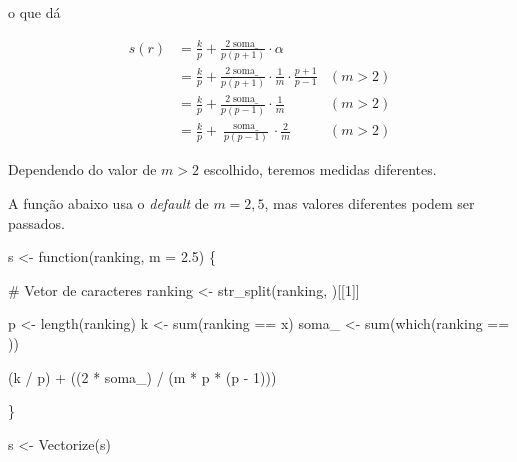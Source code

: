 \documentclass[
  letterpaper,
  DIV=11,
  numbers=noendperiod]{scrreprt}
\newenvironment{Shaded}{\begin{snugshade}}{\end{snugshade}}
\newcommand{\AttributeTok}[1]{\textcolor[rgb]{0.40,0.45,0.13}{#1}}
\newcommand{\CommentTok}[1]{\textcolor[rgb]{0.37,0.37,0.37}{#1}}
\newcommand{\ControlFlowTok}[1]{\textcolor[rgb]{0.00,0.23,0.31}{#1}}
\newcommand{\DecValTok}[1]{\textcolor[rgb]{0.68,0.00,0.00}{#1}}
\newcommand{\FloatTok}[1]{\textcolor[rgb]{0.68,0.00,0.00}{#1}}
\newcommand{\FunctionTok}[1]{\textcolor[rgb]{0.28,0.35,0.67}{#1}}
\newcommand{\NormalTok}[1]{\textcolor[rgb]{0.00,0.23,0.31}{#1}}
\newcommand{\OtherTok}[1]{\textcolor[rgb]{0.00,0.23,0.31}{#1}}
\newcommand{\SpecialCharTok}[1]{\textcolor[rgb]{0.37,0.37,0.37}{#1}}
\newcommand{\StringTok}[1]{\textcolor[rgb]{0.13,0.47,0.30}{#1}}
\begin{document}
\begin{itemize}
  o que dá

  \[
  \begin{aligned}
  s(r) 
  &= \frac{k}{p} + \frac{2\operatorname{soma\_}}{p(p+1)} \cdot \alpha \\
  &= \frac{k}{p} + \frac{2\operatorname{soma\_}}{p(p+1)} \cdot 
    \frac1m \cdot \frac{p + 1}{p - 1} & (m > 2) \\
  &= \frac{k}{p} + \frac{2\operatorname{soma\_}}{p(p-1)} \cdot 
    \frac1m & (m > 2) \\
  &= \frac{k}{p} + \frac{\operatorname{soma\_}}{p(p-1)} \cdot 
    \frac2m & (m > 2)
  \end{aligned}
  \]

  Dependendo do valor de $m > 2$ escolhido, teremos medidas diferentes.

  A função abaixo usa o \emph{default} de $m = 2{,}5$, mas valores
  diferentes podem ser passados.
\end{itemize}

\begin{Shaded}
\begin{Highlighting}[]
\NormalTok{s }\OtherTok{\textless{}{-}} \ControlFlowTok{function}\NormalTok{(ranking, }\AttributeTok{m =} \FloatTok{2.5}\NormalTok{) \{}
  
  \CommentTok{\# Vetor de caracteres}
\NormalTok{  ranking }\OtherTok{\textless{}{-}} \FunctionTok{str\_split}\NormalTok{(ranking, }\StringTok{\textquotesingle{}\textquotesingle{}}\NormalTok{)[[}\DecValTok{1}\NormalTok{]]}
  
\NormalTok{  p }\OtherTok{\textless{}{-}} \FunctionTok{length}\NormalTok{(ranking)}
\NormalTok{  k }\OtherTok{\textless{}{-}} \FunctionTok{sum}\NormalTok{(ranking }\SpecialCharTok{==} \StringTok{\textquotesingle{}x\textquotesingle{}}\NormalTok{)}
\NormalTok{  soma\_ }\OtherTok{\textless{}{-}} \FunctionTok{sum}\NormalTok{(}\FunctionTok{which}\NormalTok{(ranking }\SpecialCharTok{==} \StringTok{\textquotesingle{}{-}\textquotesingle{}}\NormalTok{))}

\NormalTok{  (k }\SpecialCharTok{/}\NormalTok{ p) }\SpecialCharTok{+}\NormalTok{ ((}\DecValTok{2} \SpecialCharTok{*}\NormalTok{ soma\_) }\SpecialCharTok{/}\NormalTok{ (m }\SpecialCharTok{*}\NormalTok{ p }\SpecialCharTok{*}\NormalTok{ (p }\SpecialCharTok{{-}} \DecValTok{1}\NormalTok{)))}

\NormalTok{\}}

\NormalTok{s }\OtherTok{\textless{}{-}} \FunctionTok{Vectorize}\NormalTok{(s)}
\end{Highlighting}
\end{Shaded}
\end{document}
